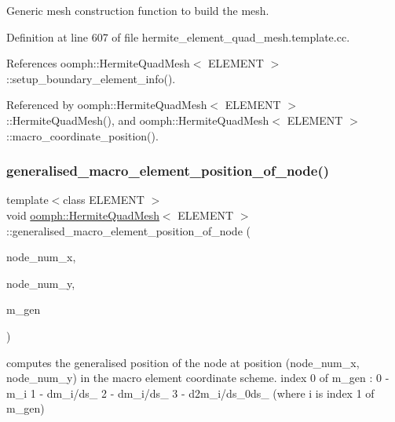 Generic mesh construction function to build the mesh. 



Definition at line 607 of file hermite\+\_\+element\+\_\+quad\+\_\+mesh.\+template.\+cc.



References oomph\+::\+Hermite\+Quad\+Mesh$<$ E\+L\+E\+M\+E\+N\+T $>$\+::setup\+\_\+boundary\+\_\+element\+\_\+info().



Referenced by oomph\+::\+Hermite\+Quad\+Mesh$<$ E\+L\+E\+M\+E\+N\+T $>$\+::\+Hermite\+Quad\+Mesh(), and oomph\+::\+Hermite\+Quad\+Mesh$<$ E\+L\+E\+M\+E\+N\+T $>$\+::macro\+\_\+coordinate\+\_\+position().

\mbox{\label{classoomph_1_1HermiteQuadMesh_a17d8992ae7fa8b46b568d156306d3c89}} 
\subsubsection{\texorpdfstring{generalised\+\_\+macro\+\_\+element\+\_\+position\+\_\+of\+\_\+node()}{generalised\_macro\_element\_position\_of\_node()}}
{\footnotesize\ttfamily template$<$class E\+L\+E\+M\+E\+NT $>$ \\
void \hyperlink{classoomph_1_1HermiteQuadMesh}{oomph\+::\+Hermite\+Quad\+Mesh}$<$ E\+L\+E\+M\+E\+NT $>$\+::generalised\+\_\+macro\+\_\+element\+\_\+position\+\_\+of\+\_\+node (\begin{DoxyParamCaption}\item[{const unsigned \&}]{node\+\_\+num\+\_\+x,  }\item[{const unsigned \&}]{node\+\_\+num\+\_\+y,  }\item[{Dense\+Matrix$<$ double $>$ \&}]{m\+\_\+gen }\end{DoxyParamCaption})\hspace{0.3cm}{\ttfamily [private]}}



computes the generalised position of the node at position (node\+\_\+num\+\_\+x, node\+\_\+num\+\_\+y) in the macro element coordinate scheme. index 0 of m\+\_\+gen \+: 0 -\/ m\+\_\+i 1 -\/ dm\+\_\+i/ds\+\_ 2 -\/ dm\+\_\+i/ds\+\_ 3 -\/ d2m\+\_\+i/ds\+\_\+0ds\+\_ (where i is index 1 of m\+\_\+gen) 



